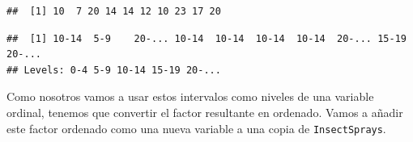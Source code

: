 \documentclass[]{book}
\newenvironment{Shaded}{\begin{snugshade}}{\end{snugshade}}
\newcommand{\DataTypeTok}[1]{\textcolor[rgb]{0.13,0.29,0.53}{#1}}
\newcommand{\DecValTok}[1]{\textcolor[rgb]{0.00,0.00,0.81}{#1}}
\newcommand{\KeywordTok}[1]{\textcolor[rgb]{0.13,0.29,0.53}{\textbf{#1}}}
\newcommand{\NormalTok}[1]{#1}
\newcommand{\OperatorTok}[1]{\textcolor[rgb]{0.81,0.36,0.00}{\textbf{#1}}}
\newcommand{\OtherTok}[1]{\textcolor[rgb]{0.56,0.35,0.01}{#1}}
\newcommand{\StringTok}[1]{\textcolor[rgb]{0.31,0.60,0.02}{#1}}
\theoremstyle{definition}
\theoremstyle{definition}
\theoremstyle{definition}
\theoremstyle{remark}
\begin{document}
\begin{Shaded}
\end{Shaded}

\begin{verbatim}
##  [1] 10  7 20 14 14 12 10 23 17 20
\end{verbatim}

\begin{Shaded}
\end{Shaded}

\begin{verbatim}
##  [1] 10-14  5-9    20-... 10-14  10-14  10-14  10-14  20-... 15-19  20-...
## Levels: 0-4 5-9 10-14 15-19 20-...
\end{verbatim}

Como nosotros vamos a usar estos intervalos como niveles de una variable ordinal, tenemos que convertir el factor resultante en ordenado. Vamos a añadir este factor ordenado como una nueva variable a una copia de \texttt{InsectSprays}.

\begin{Shaded}
\end{Shaded}
\end{document}
